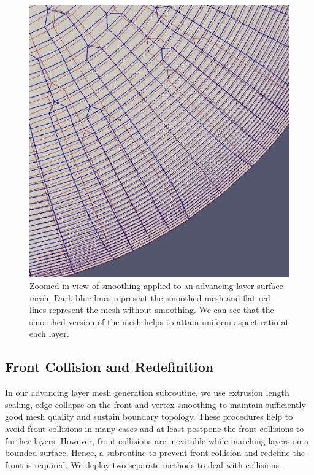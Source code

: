 \documentclass[conf]{new-aiaa}
\begin{document}
\begin{figure}
\centering
\includegraphics[width=0.4\linewidth]{smoothing/smoothing-comparison-cylinder-cap.eps}
\caption{Zoomed in view of smoothing applied to an advancing layer surface mesh. Dark blue lines represent the smoothed mesh and flat red lines represent the mesh without smoothing. We can see that the smoothed version of the mesh helps to attain uniform aspect ratio at each layer.}
\label{fig-smoothing-cylinder}
\end{figure}


\subsection{Front Collision and Redefinition}
\label{collisionSection}
In our advancing layer mesh generation subroutine, we use extrusion length scaling, edge collapse on the front and vertex smoothing to maintain sufficiently good mesh quality and sustain boundary topology. These procedures help to avoid front collisions in many cases and at least postpone the front collisions to further layers. However, front collisions are inevitable while marching layers on a bounded surface. Hence, a subroutine to prevent front collision and redefine the front is required. We deploy two separate methods to deal with collisions.
\end{document}
